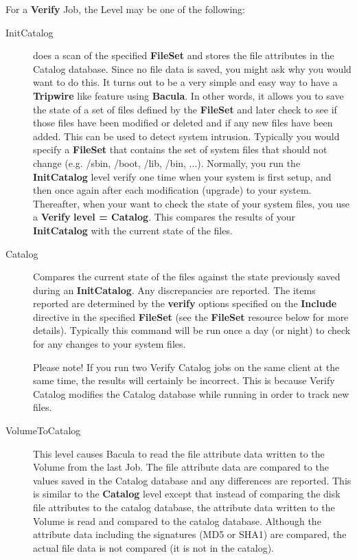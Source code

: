 \begin{description}
For a {\bf Verify} Job, the Level may be one of the  following:  

\begin{description}

\item [InitCatalog]
   does a scan of the specified {\bf FileSet} and stores the file
   attributes in the Catalog database.  Since no file data is saved, you
   might ask why you would want to do this.  It turns out to be a very
   simple and easy way to have a {\bf Tripwire} like feature using {\bf
   Bacula}.  In other words, it allows you to save the state of a set of
   files defined by the {\bf FileSet} and later check to see if those files
   have been modified or deleted and if any new files have been added.
   This can be used to detect system intrusion.  Typically you would
   specify a {\bf FileSet} that contains the set of system files that
   should not change (e.g.  /sbin, /boot, /lib, /bin, ...).  Normally, you
   run the {\bf InitCatalog} level verify one time when your system is
   first setup, and then once again after each modification (upgrade) to
   your system.  Thereafter, when your want to check the state of your
   system files, you use a {\bf Verify} {\bf level = Catalog}.  This
   compares the results of your {\bf InitCatalog} with the current state of
   the files.

\item [Catalog]
   Compares the current state of the files against the state previously
   saved during an {\bf InitCatalog}.  Any discrepancies are reported.  The
   items reported are determined by the {\bf verify} options specified on
   the {\bf Include} directive in the specified {\bf FileSet} (see the {\bf
   FileSet} resource below for more details).  Typically this command will
   be run once a day (or night) to check for any changes to your system
   files.

   Please note!  If you run two Verify Catalog jobs on the same client at
   the same time, the results will certainly be incorrect.  This is because
   Verify Catalog modifies the Catalog database while running in order to
   track new files.

\item [VolumeToCatalog]
   This level causes Bacula to read the file attribute data written to the
   Volume from the last Job.  The file attribute data are compared to the
   values saved in the Catalog database and any differences are reported.
   This is similar to the {\bf Catalog} level except that instead of
   comparing the disk file attributes to the catalog database, the
   attribute data written to the Volume is read and compared to the catalog
   database.  Although the attribute data including the signatures (MD5 or
   SHA1) are compared, the actual file data is not compared (it is not in
   the catalog).


\end{description}
\end{description}
